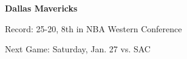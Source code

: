 \textbf{Dallas Mavericks}

Record: 25-20, 8th in NBA Western Conference

Next Game: Saturday, Jan. 27 vs. SAC